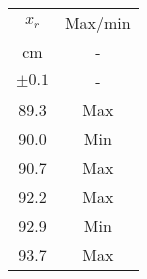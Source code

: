 \begin{table}[H]	
\begin{center}
\begin{tabular}{|c|c|}
\hline
    $x_r$	&	Max/min	\\
    cm	&	-	\\
    $\pm 0.1 $	&	-	\\ \hline
    89.3	&	Max	\\
    90.0	&	Min	\\
    90.7	&	Max	\\
    92.2	&	Max	\\
    92.9	&	Min	\\
    93.7	&	Max	\\ \hline    
\end{tabular}
\end{center}
\end{table}